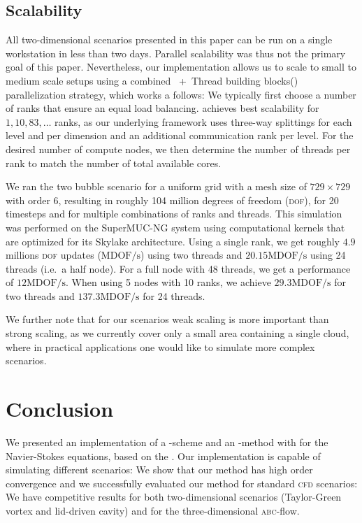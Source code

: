 \documentclass[runningheads]{llncs}
\begin{document}
\subsection{Scalability}%
\newcommand{\mdofs}{\text{MDOF/s}}%
All two-dimensional scenarios presented in this paper can be run on a single workstation in less than two days.
Parallel scalability was thus not the primary goal of this paper.
Nevertheless, our implementation allows us to scale to small to medium scale setups using a combined \mpi{}~+~Thread building blocks(\tbb{}) parallelization strategy, which works a follows:
We typically first choose a number of \mpi{} ranks that ensure an equal load balancing.
\exahype{} achieves best scalability for $1, 10, 83, \ldots$ ranks, as our underlying framework uses three-way splittings for each level and per dimension and an additional communication rank per level.
For the desired number of compute nodes, we then determine the number of \tbb{} threads per rank to match the number of total available cores.

We ran the two bubble scenario for a uniform grid with a mesh size of $729 \times 729$ with order 6, resulting in roughly 104 million degrees of freedom (\textsc{dof}), for 20 timesteps and for multiple combinations of \mpi{} ranks and \tbb{} threads.
This simulation was performed on the SuperMUC-NG system using computational kernels that are optimized for its Skylake architecture.
Using a single \mpi{} rank, we get roughly $4.9$ millions \textsc{dof} updates ($\mdofs$) using two \tbb{} threads and $20.15 \mdofs$ using 24 threads (i.e.\ a half node).
For a full node with 48 threads, we get a performance of $12 \mdofs$.
When using 5 nodes with 10 \mpi{} ranks, we achieve $29.3 \mdofs$ for two threads and $137.3 \mdofs$ for 24 threads.

We further note that for our scenarios weak scaling is more important than strong scaling, as we currently cover only a small area containing a single cloud, where in practical applications one would like to simulate more complex scenarios.
\section{Conclusion}
We presented an implementation of a \muscl{}-scheme and an \aderdg{}-method with \amr{} for the Navier-Stokes equations, based on the \exahypeengine.
Our implementation is capable of simulating different scenarios:
We show that our method has high order convergence and we successfully evaluated our method for standard \textsc{cfd} scenarios:
We have competitive results for both two-dimensional scenarios (Taylor-Green vortex and lid-driven cavity) and for the three-dimensional \textsc{abc}-flow.
\end{document}
